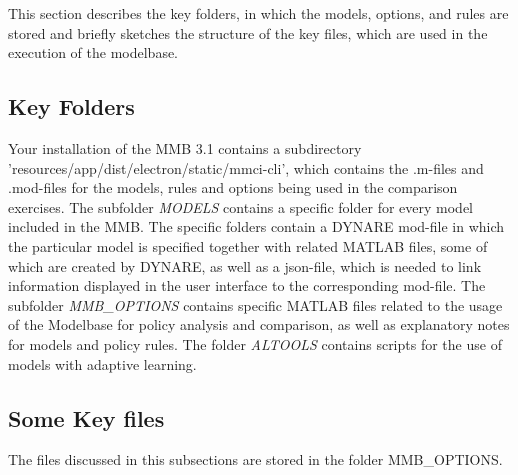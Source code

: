 This section describes the key folders, in which the models, options, and rules are stored and briefly sketches the structure of the key files, which are used in the execution of the modelbase.

\subsection*{Key Folders}
 
Your installation of the MMB 3.1 contains a subdirectory 'resources/app/dist/electron/static/mmci-cli', which contains the .m-files and .mod-files for the models, rules and options being used in the comparison exercises. 
The subfolder \textit{MODELS} contains a specific folder for every model included in the MMB. The specific folders contain a  DYNARE mod-file in which the particular model is specified together with related MATLAB files, some of which are created by DYNARE, as well as a json-file, which is needed to link information displayed in the user interface to the corresponding mod-file. The subfolder \textit{MMB\_OPTIONS} contains specific MATLAB files related to the usage of the Modelbase for policy analysis and comparison, as well as explanatory notes for models and policy rules. The folder 
\textit{ALTOOLS} contains scripts for the use of models with adaptive learning. 

\subsection*{Some Key files}
The files discussed in this subsections are stored in the folder MMB\_OPTIONS.

